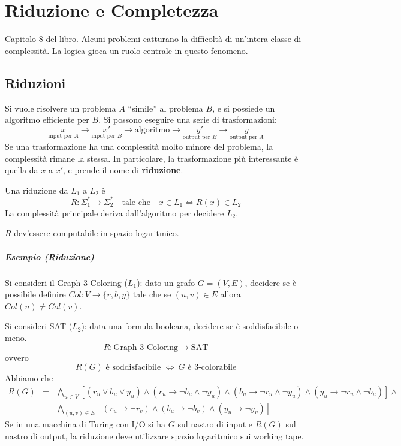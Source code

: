 \chapter{Riduzione e Completezza}
Capitolo 8 del libro. Alcuni problemi catturano la difficoltà di un'intera classe di complessità. La logica gioca un ruolo centrale in questo fenomeno.


\section{Riduzioni}
Si vuole risolvere un problema $A$ ``simile'' al problema $B$, e si possiede un algoritmo efficiente per $B$. Si possono eseguire una serie di trasformazioni:
$$
    \underset{\text{input per }A}{x} \to \underset{\text{input per }B}{x'} \to \text{algoritmo} \to \underset{\text{output per }B}{y'} \to \underset{\text{output per }A}{y}
$$
Se una trasformazione ha una complessità molto minore del problema, la complessità rimane la stessa. In particolare, la trasformazione più interessante è quella da $x$ a $x'$, e prende il nome di \textbf{riduzione}.
\begin{definition}[Riduzione]
    Una riduzione da $L_1$ a $L_2$ è
    $$
        R:\Sigma_1^*\to\Sigma_2^* \text{ ~ tale che ~ } x\in L_1 \Leftrightarrow R(x)\in L_2
    $$
    La complessità principale deriva dall'algoritmo per decidere $L_2$.
\end{definition}
$R$ dev'essere computabile in spazio logaritmico.

\paragraph{Esempio (Riduzione)} Si consideri il Graph 3-Coloring ($L_1$): dato un grafo $G=(V,E)$, decidere se è possibile definire $Col:V\to\{r,b,y\}$ tale che se $(u,v)\in E$ allora $Col(u)\neq Col(v)$.

Si consideri SAT ($L_2$): data una formula booleana, decidere se è soddisfacibile o meno. 
$$
    R:\text{Graph 3-Coloring}\to\text{SAT}
$$
ovvero
$$
    R(G) \text{ è soddisfacibile } \Leftrightarrow~ G \text{ è 3-colorabile}
$$
Abbiamo che 
\begin{eqnarray*}
    R(G) &=& \bigwedge_{u\in V} [(r_u\lor b_u\lor y_u) \land 
    (r_u\to \lnot b_u\land \lnot y_u) \land
    (b_u\to \lnot r_u\land \lnot y_u) \land
    (y_u\to \lnot r_u\land \lnot b_u)] \land\\
    & & \bigwedge_{(u,v)\in E} [(r_u\to \lnot r_v) \land (b_u\to \lnot b_v) \land (y_u\to \lnot y_v)]
\end{eqnarray*}
Se in una macchina di Turing con I/O si ha $G$ sul nastro di input e $R(G)$ sul nastro di output, la riduzione deve utilizzare spazio logaritmico sui working tape.

